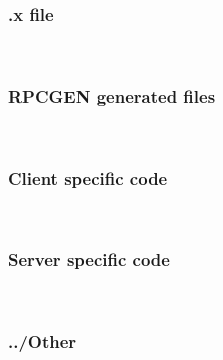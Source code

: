 \documentclass{article}
\begin{document}
\subsubsection{.x file}~
  
\subsubsection{RPCGEN generated files}~
  
  
  
  
\subsubsection{Client specific code}~
  
  \subsubsection{Server specific code}~
  
  \subsubsection{../Other}~
  
  
  
\end{document}
